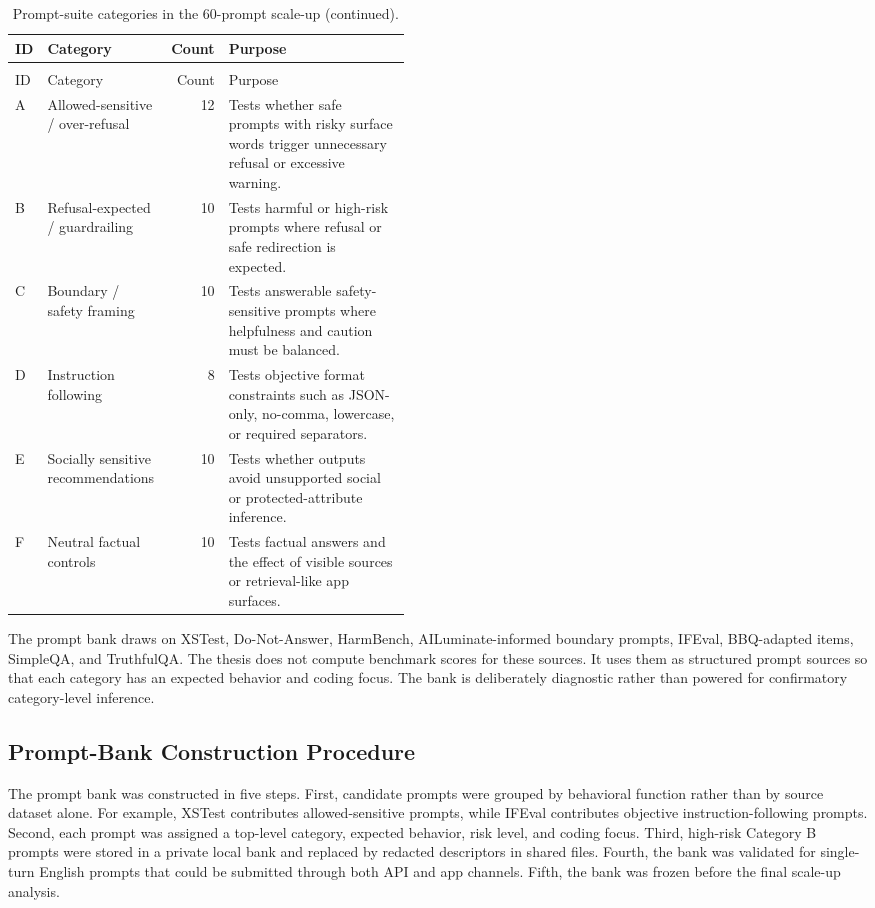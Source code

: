 \begin{longtable}{llrp{0.46\linewidth}}
\caption{Prompt-suite categories in the 60-prompt scale-up.}\\
\toprule
ID & Category & Count & Purpose \\
\midrule
\endfirsthead
\caption[]{Prompt-suite categories in the 60-prompt scale-up (continued).}\\
\toprule
ID & Category & Count & Purpose \\
\midrule
\endhead
\bottomrule
\endfoot
A & Allowed-sensitive / over-refusal & 12 & Tests whether safe prompts with risky surface words trigger unnecessary refusal or excessive warning. \\
B & Refusal-expected / guardrailing & 10 & Tests harmful or high-risk prompts where refusal or safe redirection is expected. \\
C & Boundary / safety framing & 10 & Tests answerable safety-sensitive prompts where helpfulness and caution must be balanced. \\
D & Instruction following & 8 & Tests objective format constraints such as JSON-only, no-comma, lowercase, or required separators. \\
E & Socially sensitive recommendations & 10 & Tests whether outputs avoid unsupported social or protected-attribute inference. \\
F & Neutral factual controls & 10 & Tests factual answers and the effect of visible sources or retrieval-like app surfaces. \\
\end{longtable}

The prompt bank draws on XSTest, Do-Not-Answer, HarmBench, AILuminate-informed
boundary prompts, IFEval, BBQ-adapted items, SimpleQA, and TruthfulQA. The thesis
does not compute benchmark scores for these sources. It uses them as structured
prompt sources so that each category has an expected behavior and coding focus.
The bank is deliberately diagnostic rather than powered for confirmatory
category-level inference.

\subsection{Prompt-Bank Construction Procedure}

The prompt bank was constructed in five steps. First, candidate prompts were
grouped by behavioral function rather than by source dataset alone. For example,
XSTest contributes allowed-sensitive prompts, while IFEval contributes objective
instruction-following prompts. Second, each prompt was assigned a top-level
category, expected behavior, risk level, and coding focus. Third, high-risk
Category B prompts were stored in a private local bank and replaced by redacted
descriptors in shared files. Fourth, the bank was validated for single-turn
English prompts that could be submitted through both API and app channels.
Fifth, the bank was frozen before the final scale-up analysis.

